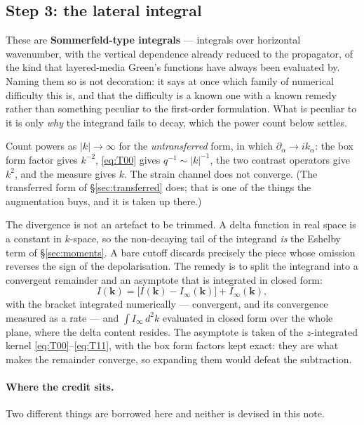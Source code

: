 \documentclass[11pt,a4paper]{article}
\begin{document}
\subsection{Step 3: the lateral integral}

These are \textbf{Sommerfeld-type integrals} --- integrals over horizontal
wavenumber, with the vertical dependence already reduced to the propagator, of
the kind that layered-media Green's functions have always been evaluated by.
Naming them so is not decoration: it says at once which family of numerical
difficulty this is, and that the difficulty is a known one with a known remedy
rather than something peculiar to the first-order formulation.  What is peculiar
to it is only \emph{why} the integrand fails to decay, which the power count
below settles.

Count powers as $|k|\to\infty$ for the \emph{untransferred} form, in which
$\partial_\alpha\to ik_\alpha$: the box form factor gives $k^{-2}$,
\eqref{eq:T00} gives $q^{-1}\sim|k|^{-1}$, the two contrast operators give
$k^{2}$, and the measure gives $k$.  The strain channel does not converge.
(The transferred form of \S\ref{sec:transferred} does; that is one of the things
the augmentation buys, and it is taken up there.)

The divergence is not an artefact to be trimmed.  A delta function in real space
is a constant in $k$-space, so the non-decaying tail of the integrand \emph{is}
the Eshelby term of \S\ref{sec:moments}.  A bare cutoff discards precisely the
piece whose omission reverses the sign of the depolarisation.  The remedy is to
split the integrand into a convergent remainder and an asymptote that is
integrated in closed form:
\begin{equation}\label{eq:splitsub}
  I(\mathbf{k}) = \bigl[I(\mathbf{k}) - I_\infty(\mathbf{k})\bigr] + I_\infty(\mathbf{k}),
\end{equation}
with the bracket integrated numerically --- convergent, and its convergence
measured as a rate --- and $\int I_\infty\,d^2k$ evaluated in closed form over
the whole plane, where the delta content resides.  The asymptote is taken of the
$z$-integrated kernel \eqref{eq:T00}--\eqref{eq:T11}, with the box form factors
kept exact: they are what makes the remainder converge, so expanding them would
defeat the subtraction.

\paragraph{Where the credit sits.}  Two different things are borrowed here and
neither is devised in this note.
\end{document}
